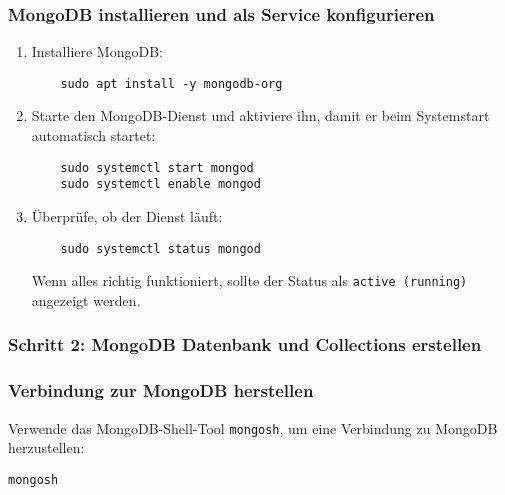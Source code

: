 \documentclass[a4paper,12pt]{article}
\begin{document}
\subsubsection{MongoDB installieren und als Service konfigurieren}
\begin{enumerate}
    \item Installiere MongoDB:

    \begin{lstlisting}
    sudo apt install -y mongodb-org
    \end{lstlisting}
    
    \item Starte den MongoDB-Dienst und aktiviere ihn, damit er beim Systemstart automatisch startet:

    \begin{lstlisting}
    sudo systemctl start mongod
    sudo systemctl enable mongod
    \end{lstlisting}
    
    \item Überprüfe, ob der Dienst läuft:

    \begin{lstlisting}
    sudo systemctl status mongod
    \end{lstlisting}
    
    Wenn alles richtig funktioniert, sollte der Status als \texttt{active (running)} angezeigt werden.
\end{enumerate}

\subsubsection{Schritt 2: MongoDB Datenbank und Collections erstellen}

\subsubsection{Verbindung zur MongoDB herstellen}
Verwende das MongoDB-Shell-Tool \texttt{mongosh}, um eine Verbindung zu MongoDB herzustellen:

\begin{lstlisting}
mongosh
\end{lstlisting}
\end{document}
